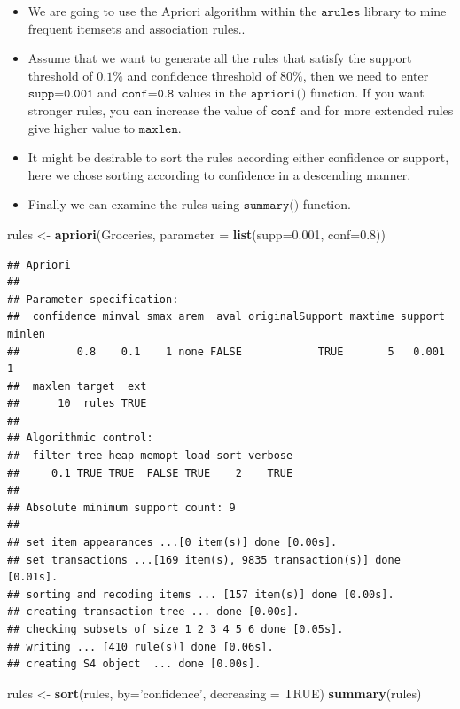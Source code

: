 \documentclass[
]{book}
\newenvironment{Shaded}{\begin{snugshade}}{\end{snugshade}}
\newcommand{\DataTypeTok}[1]{\textcolor[rgb]{0.13,0.29,0.53}{#1}}
\newcommand{\FloatTok}[1]{\textcolor[rgb]{0.00,0.00,0.81}{#1}}
\newcommand{\KeywordTok}[1]{\textcolor[rgb]{0.13,0.29,0.53}{\textbf{#1}}}
\newcommand{\NormalTok}[1]{#1}
\newcommand{\OtherTok}[1]{\textcolor[rgb]{0.56,0.35,0.01}{#1}}
\newcommand{\StringTok}[1]{\textcolor[rgb]{0.31,0.60,0.02}{#1}}
\begin{document}
\begin{itemize}
\item
  We are going to use the Apriori algorithm within the \(\texttt{arules}\) library to mine frequent itemsets and association rules..
\item
  Assume that we want to generate all the rules that satisfy the support threshold of \(0.1\%\) and confidence threshold of \(80\%\), then we need to enter \(\texttt{supp=0.001}\) and \(\texttt{conf=0.8}\) values in the \(\texttt{apriori()}\) function. If you want stronger rules, you can increase the value of \(\texttt{conf}\) and for more extended rules give higher value to \(\texttt{maxlen}\).
\item
  It might be desirable to sort the rules according either confidence or support, here we chose sorting according to confidence in a descending manner.
\item
  Finally we can examine the rules using \(\texttt{summary()}\) function.
\end{itemize}

\begin{Shaded}
\begin{Highlighting}[]
\NormalTok{rules <-}\StringTok{ }\KeywordTok{apriori}\NormalTok{(Groceries, }\DataTypeTok{parameter =} \KeywordTok{list}\NormalTok{(}\DataTypeTok{supp=}\FloatTok{0.001}\NormalTok{, }\DataTypeTok{conf=}\FloatTok{0.8}\NormalTok{))}
\end{Highlighting}
\end{Shaded}

\begin{verbatim}
## Apriori
## 
## Parameter specification:
##  confidence minval smax arem  aval originalSupport maxtime support minlen
##         0.8    0.1    1 none FALSE            TRUE       5   0.001      1
##  maxlen target  ext
##      10  rules TRUE
## 
## Algorithmic control:
##  filter tree heap memopt load sort verbose
##     0.1 TRUE TRUE  FALSE TRUE    2    TRUE
## 
## Absolute minimum support count: 9 
## 
## set item appearances ...[0 item(s)] done [0.00s].
## set transactions ...[169 item(s), 9835 transaction(s)] done [0.01s].
## sorting and recoding items ... [157 item(s)] done [0.00s].
## creating transaction tree ... done [0.00s].
## checking subsets of size 1 2 3 4 5 6 done [0.05s].
## writing ... [410 rule(s)] done [0.06s].
## creating S4 object  ... done [0.00s].
\end{verbatim}

\begin{Shaded}
\begin{Highlighting}[]
\NormalTok{rules <-}\StringTok{ }\KeywordTok{sort}\NormalTok{(rules, }\DataTypeTok{by=}\StringTok{'confidence'}\NormalTok{, }\DataTypeTok{decreasing =} \OtherTok{TRUE}\NormalTok{)}
\KeywordTok{summary}\NormalTok{(rules)}
\end{Highlighting}
\end{Shaded}
\end{document}
